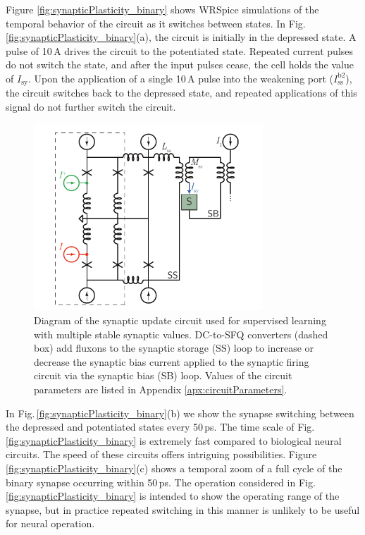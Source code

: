 \documentclass[aip,amsmath,amssymb,reprint,nofootinbib]{revtex4-1}
\begin{document}
Figure \ref{fig:synapticPlasticity_binary} shows WRSpice simulations of the temporal behavior of the circuit as it switches between states. In Fig.\,\ref{fig:synapticPlasticity_binary}(a), the circuit is initially in the depressed state. A pulse of 10\,\textmu A drives the circuit to the potentiated state. Repeated current pulses do not switch the state, and after the input pulses cease, the cell holds the value of $I_{\mathrm{sy}}$. Upon the application of a single 10\,\textmu A pulse into the weakening port ($I_{\mathrm{ss}}^{\mathrm{b2}}$), the circuit switches back to the depressed state, and repeated applications of this signal do not further switch the circuit.

\begin{figure}[t!]
	\centerline{\includegraphics[width=8.6cm]{_synapticPlasticity_supervisedCircuit_small.pdf}}
	\caption{\label{fig:synapticPlasticity_supervisedCircuit} Diagram of the synaptic update circuit used for supervised learning with multiple stable synaptic values. DC-to-SFQ converters (dashed box) add fluxons to the synaptic storage (SS) loop to increase or decrease the synaptic bias current applied to the synaptic firing circuit via the synaptic bias (SB) loop. Values of the circuit parameters are listed in Appendix \ref{apx:circuitParameters}.}
\end{figure}
In Fig.\,\ref{fig:synapticPlasticity_binary}(b) we show the synapse switching between the depressed and potentiated states every 50\,ps. The time scale of Fig.\,\ref{fig:synapticPlasticity_binary} is extremely fast compared to biological neural circuits. The speed of these circuits offers intriguing possibilities. Figure \ref{fig:synapticPlasticity_binary}(c) shows a temporal zoom of a full cycle of the binary synapse occurring within 50\,ps. The operation considered in Fig.\,\ref{fig:synapticPlasticity_binary} is intended to show the operating range of the synapse, but in practice repeated switching in this manner is unlikely to be useful for neural operation.   
\end{document}
